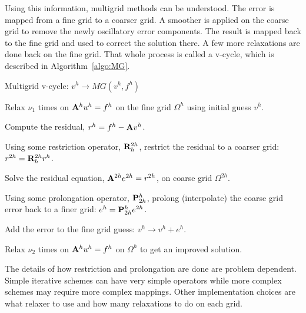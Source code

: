 Using this information, multigrid methods can be understood. The error is mapped from a fine grid to a coarser grid. A smoother is applied on the coarse grid to remove the newly oscillatory error components. The result is mapped back to the fine grid and used to correct the solution there. A few more relaxations are done back on the fine grid. That whole process is called a v-cycle, which is described in Algorithm~\ref{algo:MG}.
%
\begin{algorithm}
  \caption{ Multigrid v-cycle: $v^h \rightarrow MG(v^h, f^h)$}
  \label{algo:MG}
  \begin{list}{}{\hspace{2.5em}}
    \item Relax $\nu_1$ times on $\mathbf{A}^h u^h = f^h$ on the fine grid $\Omega^h$ using initial guess $v^h$.
    \item Compute the residual, $r^h = f^h - \mathbf{A} v^h$. 
    \item Using some restriction operator, $\mathbf{R}_h^{2h}$, restrict the residual to a coarser grid: $r^{2h} =  \mathbf{R}_h^{2h} r^h$. 
    \item Solve the residual equation, $\mathbf{A}^{2h} e^{2h} = r^{2h}$, on coarse grid $\Omega^{2h}$. 
    \item Using some prolongation operator, $\mathbf{P}_{2h}^h$, prolong (interpolate) the coarse grid error back to a finer grid: $e^h = \mathbf{P}_{2h}^h e^{2h}$. 
    \item Add the error to the fine grid guess: $v^h \rightarrow v^h + e^h$. 
    \item Relax $\nu_2$ times on $\mathbf{A}^h u^h = f^h$ on $\Omega^h$ to get an improved solution. 
   \end{list}
\end{algorithm}
%
The details of how restriction and prolongation are done are problem dependent. Simple iterative schemes can have very simple operators while more complex schemes may require more complex mappings. Other implementation choices are what relaxer to use and how many relaxations to do on each grid.

